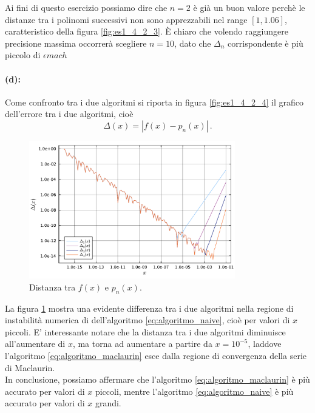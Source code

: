 \documentclass[letterpaper, 12pt]{article}
\begin{document}
Ai fini di questo esercizio possiamo dire che $n = 2$ è già un buon valore perchè le distanze tra i 
polinomi successivi non sono apprezzabili nel range $[1, 1.06]$, caratteristico della figura \ref{fig:es1_4_2_3}.
È chiaro che volendo raggiungere precisione massima occorrerà scegliere $n = 10$, dato che $\Delta_n$ 
corrispondente è più piccolo di $\epsilon{mach}$

\paragraph{(d): } Come confronto tra i due algoritmi si riporta in figura \ref{fig:es1_4_2_4} il grafico 
dell'errore tra i due algoritmi, cioè
\begin{equation}
    \Delta(x) = \left| f(x) - p_n(x) \right|\,.
\end{equation}

\begin{figure}[!ht]
    \centering
    \includegraphics[width=0.8\textwidth]{1425.pdf}
    \caption{Distanza tra $f(x)$ e $p_n(x)$.}
    \label{fig:es1_4_2_5}
\end{figure}

La figura \ref{fig:es1_4_2_5} mostra una evidente differenza tra i due algoritmi nella regione di instabilità
numerica di dell'algoritmo \ref{eq:algoritmo_naive}, cioè per valori di $x$ piccoli. E' interessante notare che 
la distanza tra i due algoritmi diminuisce all'aumentare di $x$, ma torna ad aumentare a partire da
$x = 10^{-5}$, laddove l'algoritmo \ref{eq:algoritmo_maclaurin} esce dalla regione di convergenza della 
serie di Maclaurin. \\
In conclusione, possiamo affermare che l'algoritmo \ref{eq:algoritmo_maclaurin} è più accurato
per valori di $x$ piccoli, mentre l'algoritmo \ref{eq:algoritmo_naive} è più accurato per valori di $x$
grandi.
\end{document}
